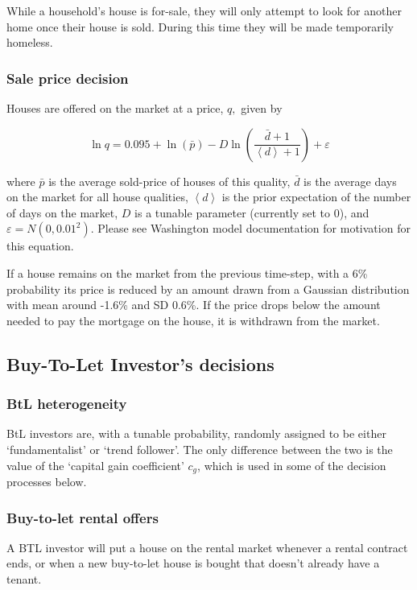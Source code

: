 \documentclass{article}
\begin{document}
While a household's house is for-sale, they will only attempt to look for another home once their house is sold. During this time they will be made temporarily homeless.

\subsubsection{Sale price decision}
\label{saleprice}
Houses are offered on the market at a price, $q,$ given by

\begin{equation}
\ln q=0.095+\ln (\bar{p})-D\ln \left( \frac{\bar{d}+1}{\left\langle
d\right\rangle +1}\right) +\varepsilon
\end{equation}

\bigskip

where $\bar{p}$ is the average sold-price of houses of this quality, $\bar{d}
$ is the average days on the market for all house qualities, $\left\langle
d\right\rangle $ is the prior expectation of the number of days on the
market, $D$ is a tunable parameter (currently set to 0), and $\varepsilon
=N(0,0.01^{2})$. Please see Washington model documentation for motivation for this equation.

If a house remains on the market from the previous time-step, with a 6\%
probability its price is reduced by an amount drawn from a Gaussian
distribution with mean around -1.6\% and SD 0.6\%.  If the price drops below the amount needed to pay the mortgage on the house, it is withdrawn from the market.


\subsection{Buy-To-Let Investor's decisions}
\subsubsection{BtL heterogeneity}
BtL investors are, with a tunable probability, randomly assigned to be either `fundamentalist' or `trend follower'. The only difference between the two is the value of the `capital gain coefficient' $c_{g}$, which is used in some of the decision processes below.

\subsubsection{Buy-to-let rental offers}
A BTL investor will put a house on the rental market
whenever a rental contract ends, or when a new buy-to-let house is bought
that doesn't already have a tenant. 
\end{document}
